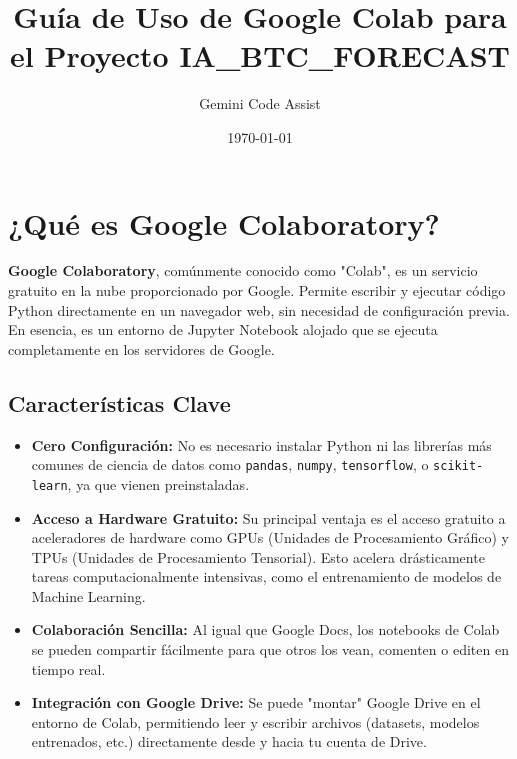 \documentclass[12pt, a4paper]{article}
\begin{document}
\title{Guía de Uso de Google Colab para el Proyecto IA\_BTC\_FORECAST}
\author{Gemini Code Assist}
\date{\today}
\maketitle

\tableofcontents
\newpage

\section{¿Qué es Google Colaboratory?}

\textbf{Google Colaboratory}, comúnmente conocido como "Colab", es un servicio gratuito en la nube proporcionado por Google. Permite escribir y ejecutar código Python directamente en un navegador web, sin necesidad de configuración previa. En esencia, es un entorno de Jupyter Notebook alojado que se ejecuta completamente en los servidores de Google.

\subsection{Características Clave}
\begin{itemize}
    \item \textbf{Cero Configuración:} No es necesario instalar Python ni las librerías más comunes de ciencia de datos como \texttt{pandas}, \texttt{numpy}, \texttt{tensorflow}, o \texttt{scikit-learn}, ya que vienen preinstaladas.
    
    \item \textbf{Acceso a Hardware Gratuito:} Su principal ventaja es el acceso gratuito a aceleradores de hardware como GPUs (Unidades de Procesamiento Gráfico) y TPUs (Unidades de Procesamiento Tensorial). Esto acelera drásticamente tareas computacionalmente intensivas, como el entrenamiento de modelos de Machine Learning.
    
    \item \textbf{Colaboración Sencilla:} Al igual que Google Docs, los notebooks de Colab se pueden compartir fácilmente para que otros los vean, comenten o editen en tiempo real.
    
    \item \textbf{Integración con Google Drive:} Se puede "montar" Google Drive en el entorno de Colab, permitiendo leer y escribir archivos (datasets, modelos entrenados, etc.) directamente desde y hacia tu cuenta de Drive.
\end{itemize}
\end{document}
